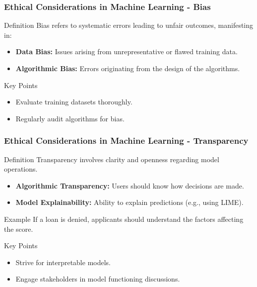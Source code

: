 \documentclass[aspectratio=169]{beamer}
\begin{document}
\begin{frame}[fragile]
    \frametitle{Ethical Considerations in Machine Learning - Bias}
    \begin{block}{Definition}
        Bias refers to systematic errors leading to unfair outcomes, manifesting in:
    \end{block}
    \begin{itemize}
        \item \textbf{Data Bias:} Issues arising from unrepresentative or flawed training data.
        \item \textbf{Algorithmic Bias:} Errors originating from the design of the algorithms.
    \end{itemize}

    \begin{block}{Key Points}
        \begin{itemize}
            \item Evaluate training datasets thoroughly.
            \item Regularly audit algorithms for bias.
        \end{itemize}
    \end{block}
\end{frame}

\begin{frame}[fragile]
    \frametitle{Ethical Considerations in Machine Learning - Transparency}
    \begin{block}{Definition}
        Transparency involves clarity and openness regarding model operations.
    \end{block}
    \begin{itemize}
        \item \textbf{Algorithmic Transparency:} Users should know how decisions are made.
        \item \textbf{Model Explainability:} Ability to explain predictions (e.g., using LIME).
    \end{itemize}
    
    \begin{block}{Example}
        If a loan is denied, applicants should understand the factors affecting the score.
    \end{block}

    \begin{block}{Key Points}
        \begin{itemize}
            \item Strive for interpretable models.
            \item Engage stakeholders in model functioning discussions.
        \end{itemize}
    \end{block}
\end{frame}
\end{document}
